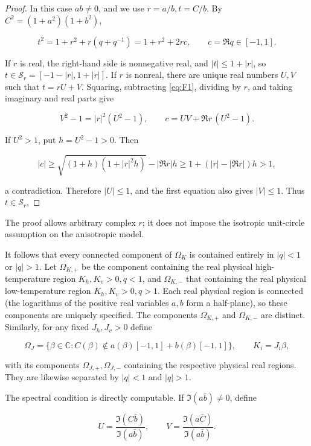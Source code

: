\documentclass[11pt,a4paper]{article}
\numberwithin{equation}{section}
\theoremstyle{plain}
\theoremstyle{definition}
\begin{document}
\begin{proof}

In this case \(ab\ne0\), and we use \(r=a/b,t=C/b\). By \(C^2=(1+a^2)(1+b^2)\),

\begin{equation}
t^2=1+r^2+r(q+q^{-1})=1+r^2+2r c,\qquad c=\Re q\in[-1,1].
\label{eq:F1}
\end{equation}

If \(r\) is real, the right-hand side is nonnegative real, and \(|t|\le1+|r|\), so \(t\in\mathcal S_r=[-1-|r|,1+|r|]\). If \(r\) is nonreal, there are unique real numbers \(U,V\) such that \(t=rU+V\). Squaring, subtracting \eqref{eq:F1}, dividing by \(r\), and taking imaginary and real parts give

\[V^2-1=|r|^2(U^2-1),\qquad c=UV+\Re r\,(U^2-1).\]

If \(U^2>1\), put \(h=U^2-1>0\). Then

\[|c|\ge\sqrt{(1+h)(1+|r|^2h)}-|\Re r|h\ge1+(|r|-|\Re r|)h>1,\]

a contradiction. Therefore \(|U|\le1\), and the first equation also gives \(|V|\le1\). Thus \(t\in\mathcal S_r\),

\end{proof}

The proof allows arbitrary complex \(r\); it does not impose the isotropic unit-circle assumption on the anisotropic model.

It follows that every connected component of \(\Omega_K\) is contained entirely in \(|q|<1\) or \(|q|>1\). Let \(\Omega_{K,+}\) be the component containing the real physical high-temperature region \(K_h,K_v>0,q<1\), and \(\Omega_{K,-}\) that containing the real physical low-temperature region \(K_h,K_v>0,q>1\). Each real physical region is connected (the logarithms of the positive real variables \(a,b\) form a half-plane), so these components are uniquely specified. The components \(\Omega_{K,+}\) and \(\Omega_{K,-}\) are distinct. Similarly, for any fixed \(J_h,J_v>0\) define

\[\Omega_J=\{\beta\in\mathbb C:C(\beta)\notin a(\beta)[-1,1]+b(\beta)[-1,1]\},\qquad K_i=J_i\beta,\]

with its components \(\Omega_{J,+},\Omega_{J,-}\) containing the respective physical real regions. They are likewise separated by \(|q|<1\) and \(|q|>1\).

The spectral condition is directly computable. If \(\Im(a\bar b)\ne0\), define

\[U=\frac{\Im(C\bar b)}{\Im(a\bar b)},\qquad V=\frac{\Im(a\bar C)}{\Im(a\bar b)}.\]
\end{document}
